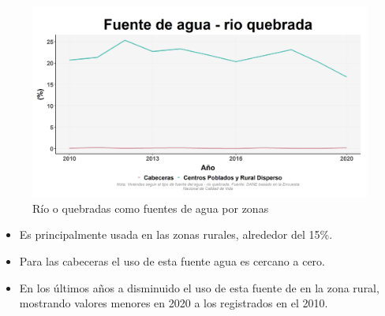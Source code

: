     \begin{figure}[H]
        \caption{Río o quebradas como fuentes de agua por zonas \label{map_result_2} }
        \begin{center}
        \includegraphics[width=\textwidth,keepaspectratio]{img/var_142_trend.png}
        \end{center}
    \end{figure}
            \begin{itemize}
                    \item Es principalmente usada en las zonas rurales, alrededor del 15\%.
                    \item Para las cabeceras el uso de esta fuente agua es cercano a cero.
                    \item En los últimos años a disminuido el uso de esta fuente de en la zona rural, mostrando valores menores en 2020 a los registrados en el 2010.
                    \end{itemize}

